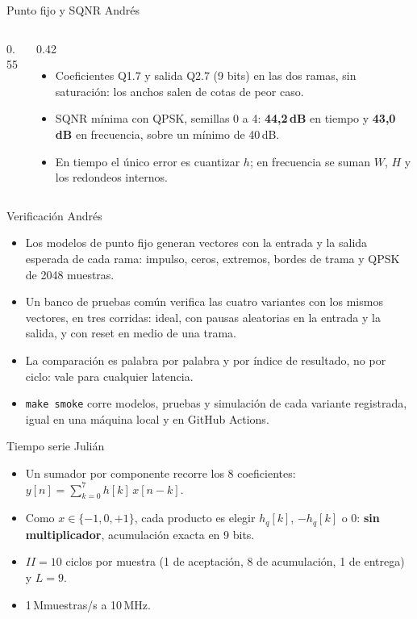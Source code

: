 \documentclass[aspectratio=169,11pt]{beamer}
\newcommand{\presenta}[1]{\hfill{\normalfont\small\color{gray}#1}}
\begin{document}
\begin{frame}{Punto fijo y SQNR \presenta{Andrés}}
  \begin{columns}[T]
    \begin{column}{0.55\textwidth}
      \resizebox{\linewidth}{!}{}
    \end{column}
    \begin{column}{0.42\textwidth}
      \small
      \begin{itemize}
        \item Coeficientes Q1.7 y salida Q2.7 (9 bits) en las dos ramas, sin saturación: los anchos salen de cotas de peor caso.
        \item SQNR mínima con QPSK, semillas 0 a 4: \textbf{44,2\,dB} en tiempo y \textbf{43,0\,dB} en frecuencia, sobre un mínimo de 40\,dB.
        \item En tiempo el único error es cuantizar $h$; en frecuencia se suman $W$, $H$ y los redondeos internos.
      \end{itemize}
    \end{column}
  \end{columns}
\end{frame}

\begin{frame}{Verificación \presenta{Andrés}}
  \begin{itemize}
    \item Los modelos de punto fijo generan vectores con la entrada y la salida esperada de cada rama: impulso, ceros, extremos, bordes de trama y QPSK de 2048 muestras.
    \item Un banco de pruebas común verifica las cuatro variantes con los mismos vectores, en tres corridas: ideal, con pausas aleatorias en la entrada y la salida, y con reset en medio de una trama.
    \item La comparación es palabra por palabra y por índice de resultado, no por ciclo: vale para cualquier latencia.
    \item \texttt{make smoke} corre modelos, pruebas y simulación de cada variante registrada, igual en una máquina local y en GitHub Actions.
  \end{itemize}
\end{frame}

\begin{frame}{Tiempo serie \presenta{Julián}}
  \begin{itemize}
    \item Un sumador por componente recorre los 8 coeficientes: $y[n] = \sum_{k=0}^{7} h[k]\,x[n-k]$.
    \item Como $x \in \{-1, 0, +1\}$, cada producto es elegir $h_q[k]$, $-h_q[k]$ o 0: \textbf{sin multiplicador}, acumulación exacta en 9 bits.
    \item $II = 10$ ciclos por muestra (1 de aceptación, 8 de acumulación, 1 de entrega) y $L = 9$.
    \item 1\,Mmuestras/s a 10\,MHz.
  \end{itemize}
\end{frame}
\end{document}
